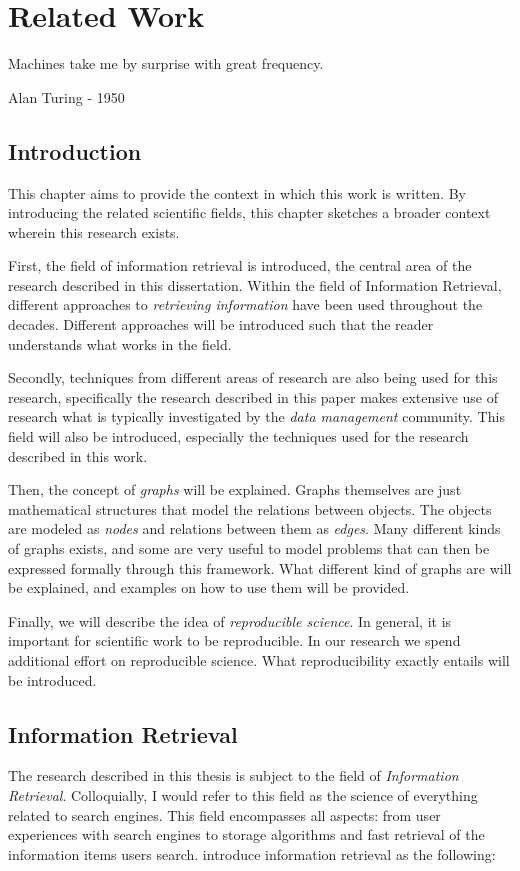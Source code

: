\chapter{Related Work}
\label{related-work}

\epigraph{Machines take me by surprise with great frequency.}{Alan Turing - 1950}

\section{Introduction}
This chapter aims to provide the context in which this work is written. By introducing the related scientific fields, this chapter sketches a broader context wherein this research exists. 

First, the field of information retrieval is introduced, the central area of the research described in this dissertation. Within the field of Information Retrieval, different approaches to \emph{retrieving information} have been used throughout the decades. Different approaches will be introduced such that the reader understands what works in the field.

Secondly, techniques from different areas of research are also being used for this research, specifically the research described in this paper makes extensive use of research what is typically investigated by the \emph{data management} community. This field will also be introduced, especially the techniques used for the research described in this work. 

Then, the concept of \emph{graphs} will be explained. Graphs themselves are just mathematical structures that model the relations between objects. The objects are modeled as \emph{nodes} and relations between them as \emph{edges}. Many different kinds of graphs exists, and some are very useful to model problems that can then be expressed formally through this framework. What different kind of graphs are will be explained, and examples on how to use them will be provided.

Finally, we will describe the idea of \emph{reproducible science}. In general, it is important for scientific work to be reproducible. In our research we spend additional effort on reproducible science. What reproducibility exactly entails will be introduced.  

\section{Information Retrieval}
The research described in this thesis is subject to the field of \emph{Information Retrieval}. Colloquially, I would refer to this field as the science of everything related to search engines. This field encompasses all aspects: from user experiences with search engines to storage algorithms and fast retrieval of the information items users search.  introduce information retrieval as the following:

